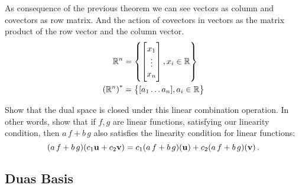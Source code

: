 \begin{remark}
As consequence of the previous theorem we can see vectors as column and covectors as row matrix. And the action of covectors in vectors as  the matrix product of the row vector and the column vector.
\begin{align}
\mathbb{R}^n &=\left\{ \begin{bmatrix}x_1\\ \vdots\\ x_n\end{bmatrix}, x_i\in \mathbb{R}\right\}\\
 \left(\mathbb{R}^n\right)^*&=\left\{ [a_1 \dots a_n], a_i\in \mathbb{R} \right\}
\end{align}


\end{remark}





\begin{pro}\label{exercise:linearfunctions} 

Show that  the dual  space is closed under this linear combination operation. In other words, show that if $f,g$ are linear functions, satisfying our linearity condition, then $a\, f + b\, g$ also satisfies the linearity condition for linear functions:
$$
 (a\,f + b\,g)(c_1\mathbf{ u}+c_2\mathbf{ v}) = c_1 (a\,f + b\,g)(\mathbf{ u}) + c_2 (a\,f + b\,g)(\mathbf{ v})\,.
$$
\end{pro}





\subsection{Duas Basis}

